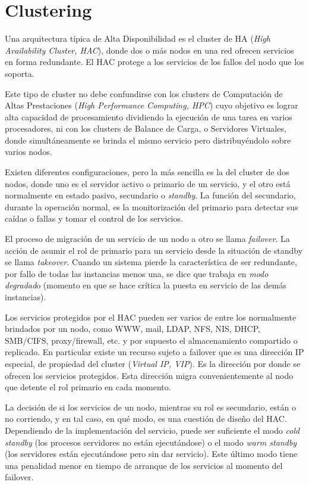 \section {Clustering}

Una arquitectura típica de Alta Disponibilidad es el cluster de HA (\textit{High Availability Cluster, HAC}), donde dos o más nodos en una red ofrecen servicios en forma redundante. El HAC protege a los servicios de los fallos del nodo que los soporta.

Este tipo de cluster no debe confundirse con los clusters de Computación de Altas Prestaciones (\textit{High Performance Computing, HPC}) cuyo objetivo es lograr alta capacidad de procesamiento dividiendo la ejecución de una tarea en varios procesadores, ni con los clusters de Balance de Carga, o Servidores Virtuales, donde simultáneamente se brinda el mismo servicio pero distribuyéndolo sobre varios nodos.

Existen diferentes configuraciones, pero la más sencilla es la del cluster de dos nodos, donde uno es el servidor activo o primario de un servicio, y el otro está normalmente en estado pasivo, secundario o \textit{standby}. La función del secundario, durante la operación normal, es la monitorización del primario para detectar sus caídas o fallas y tomar el control de los servicios.

El proceso de migración de un servicio de un nodo a otro se llama \textit{failover}. La acción de asumir el rol de primario para un servicio desde la situación de standby se llama \textit{takeover}. Cuando un sistema pierde la característica de ser redundante, por fallo de todas las instancias menos una, se dice que trabaja en \textit{modo degradad}o (momento en que se hace crítica la puesta en servicio de las demás instancias).

Los servicios protegidos por el HAC pueden ser varios de entre los normalmente brindados por un nodo, como WWW, mail, LDAP, NFS, NIS, DHCP, SMB/CIFS, proxy/firewall, etc. y por supuesto el almacenamiento compartido o replicado. En particular existe un recurso sujeto a failover que es una dirección IP especial, de propiedad del cluster (\textit{Virtual IP, VIP}). Es la dirección por donde se ofrecen los servicios protegidos. Esta dirección migra convenientemente al nodo que detente el rol primario en cada momento.

La decisión de si los servicios de un nodo, mientras su rol es secundario, están o no corriendo, y en tal caso, en qué modo, es una cuestión de diseño del HAC. Dependiendo de la implementación del servicio, puede ser suficiente el modo \textit{cold standby} (los procesos servidores no están ejecutándose) o el modo \textit{warm standby} (los servidores están ejecutándose pero sin dar servicio). Este último modo tiene una penalidad menor en tiempo de arranque de los servicios al momento del failover.

